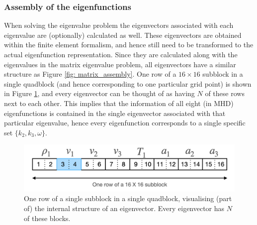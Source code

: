 \subsubsection{Assembly of the eigenfunctions}
When solving the eigenvalue problem the eigenvectors associated with each eigenvalue are (optionally) calculated as well. These eigenvectors are obtained within the finite element formalism, and hence still need to be transformed to the actual eigenfunction representation. Since they are calculated along with the eigenvalues in the matrix eigenvalue problem, all eigenvectors have a similar structure as Figure \ref{fig: matrix_assembly}. One row of a $16 \times 16$ subblock in a single quadblock (and hence corresponding to one particular grid point) is shown in Figure \ref{fig: subblock_row}, and every eigenvector can be thought of as having $N$ of these rows next to each other. This implies that the information of all eight (in MHD) eigenfunctions is contained in the single eigenvector associated with that particular eigenvalue, hence every eigenfunction corresponds to a single specific set $\{k_2, k_3, \omega\}$.

\begin{figure}[t]
  \centering
  \includegraphics[width=\textwidth]{subblock_row.png}
  \caption{
    One row of a single subblock in a single quadblock, visualising (part of) the internal structure of an eigenvector. Every eigenvector has $N$ of these blocks.
  }
  \label{fig: subblock_row}
\end{figure}

